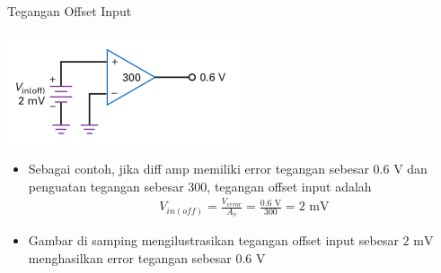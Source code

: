 \documentclass[aspectratio=169]{beamer}
\begin{document}
\begin{frame}{Tegangan Offset Input}
	\begin{multicols}{2}
		\begin{center}
			\includegraphics[height=0.4\textheight]{gambar/01.diff-amp/01.input_offset_voltage_is_equivalent_to_an_unwanted_input_voltage}
		\end{center}
		\columnbreak
		\begin{itemize}
			\item Sebagai contoh, jika diff amp memiliki error tegangan sebesar $ 0.6 \text{ V} $ dan penguatan tegangan sebesar 300, tegangan offset input adalah
			\begin{align*}
				V_{in(off)} = \frac{V_{error}}{A_v} = \frac{0.6 \text{ V}}{300} = 2 \text{ mV}
			\end{align*}
			\item Gambar di samping mengilustrasikan tegangan offset input sebesar $ 2 \text{ mV} $ menghasilkan error tegangan sebesar $ 0.6 \text{ V} $
		\end{itemize}
	\end{multicols}
\end{frame}
\end{document}

